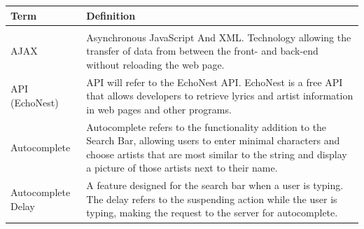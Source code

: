\documentclass[]{article}
\begin{document}
\begin{longtable}[c]{@{}ll@{}}
\toprule\addlinespace
\begin{minipage}[t]{0.47\columnwidth}\raggedright
Term
\end{minipage} & \begin{minipage}[t]{0.47\columnwidth}\raggedright
Definition
\end{minipage}
\\
\hline
\\\addlinespace
\begin{minipage}[t]{0.47\columnwidth}\raggedright
AJAX
\end{minipage} & \begin{minipage}[t]{0.47\columnwidth}\raggedright
Asynchronous JavaScript And XML. Technology allowing the transfer of
data from between the front- and back-end without reloading the web
page.
\end{minipage}
\\\addlinespace
\begin{minipage}[t]{0.47\columnwidth}\raggedright
API (EchoNest)
\end{minipage} & \begin{minipage}[t]{0.47\columnwidth}\raggedright
API will refer to the EchoNest API. EchoNest is a free API that allows
developers to retrieve lyrics and artist information in web pages and
other programs.
\end{minipage}
\\\addlinespace
\begin{minipage}[t]{0.47\columnwidth}\raggedright
Autocomplete
\end{minipage} & \begin{minipage}[t]{0.47\columnwidth}\raggedright
Autocomplete refers to the functionality addition to the Search Bar,
allowing users to enter minimal characters and choose artists that are
most similar to the string and display a picture of those artists next
to their name.
\end{minipage}
\\\addlinespace
\begin{minipage}[t]{0.47\columnwidth}\raggedright
Autocomplete Delay
\end{minipage} & \begin{minipage}[t]{0.47\columnwidth}\raggedright
A feature designed for the search bar when a user is typing. The delay
refers to the suspending action while the user is typing, making the
request to the server for autocomplete.
\end{minipage}

\end{longtable}
\end{document}
